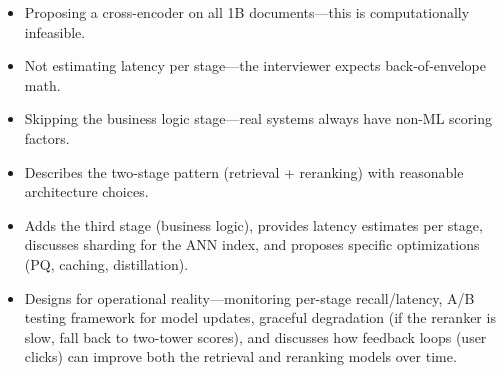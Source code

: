 \begin{interviewq}
\redflags
\begin{itemize}
    \item Proposing a cross-encoder on all 1B documents---this is computationally infeasible.
    \item Not estimating latency per stage---the interviewer expects back-of-envelope math.
    \item Skipping the business logic stage---real systems always have non-ML scoring factors.
\end{itemize}


\goodgreat
\begin{itemize}
    \item {} Describes the two-stage pattern (retrieval + reranking) with reasonable architecture choices.
    \item {} Adds the third stage (business logic), provides latency estimates per stage, discusses sharding for the ANN index, and proposes specific optimizations (PQ, caching, distillation).
    \item {} Designs for operational reality---monitoring per-stage recall/latency, A/B testing framework for model updates, graceful degradation (if the reranker is slow, fall back to two-tower scores), and discusses how feedback loops (user clicks) can improve both the retrieval and reranking models over time.
\end{itemize}

\end{interviewq}


